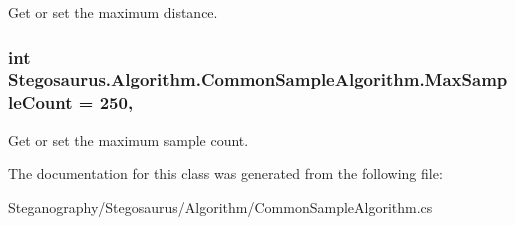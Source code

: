 Get or set the maximum distance. 

\subsubsection[{\texorpdfstring{Max\+Sample\+Count}{MaxSampleCount}}]{\setlength{\rightskip}{0pt plus 5cm}int Stegosaurus.\+Algorithm.\+Common\+Sample\+Algorithm.\+Max\+Sample\+Count = 250\hspace{0.3cm}{\ttfamily [get]}, {\ttfamily [set]}}\hypertarget{class_stegosaurus_1_1_algorithm_1_1_common_sample_algorithm_ae08e3bf46e7f8d2b6aa465ca9a54f0b6}{}\label{class_stegosaurus_1_1_algorithm_1_1_common_sample_algorithm_ae08e3bf46e7f8d2b6aa465ca9a54f0b6}


Get or set the maximum sample count. 



The documentation for this class was generated from the following file\+:\begin{DoxyCompactItemize}
\item 
Steganography/\+Stegosaurus/\+Algorithm/Common\+Sample\+Algorithm.\+cs\end{DoxyCompactItemize}
